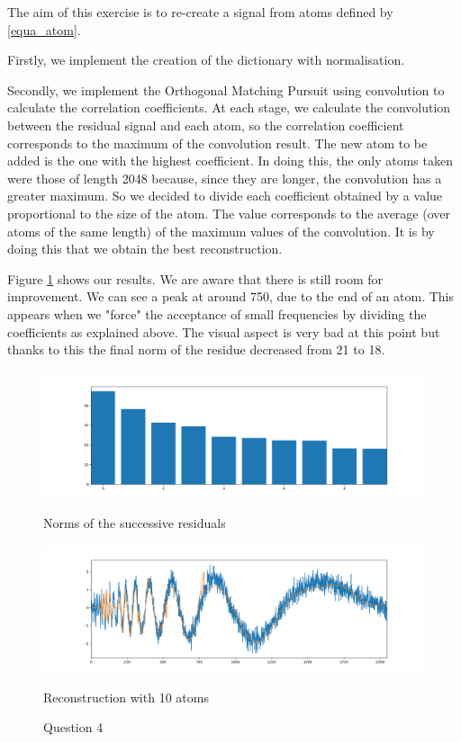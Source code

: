 \documentclass[11pt]{article}
\begin{document}
\begin{solution}

The aim of this exercise is to re-create a signal from atoms defined by \ref{equa_atom}.

Firstly, we implement the creation of the dictionary with normalisation.

Secondly, we implement the Orthogonal Matching Pursuit using convolution to calculate the correlation coefficients. At each stage, we calculate the convolution between the residual signal and each atom, so the correlation coefficient corresponds to the maximum of the convolution result. The new atom to be added is the one with the highest coefficient. In doing this, the only atoms taken were those of length 2048 because, since they are longer, the convolution has a greater maximum. So we decided to divide each coefficient obtained by a value proportional to the size of the atom. The value corresponds to the average (over atoms of the same length) of the maximum values of the convolution. It is by doing this that we obtain the best reconstruction.

Figure \ref{q4} shows our results. We are aware that there is still room for improvement. We can see a peak at around 750, due to the end of an atom. This appears when we "force" the acceptance of small frequencies by dividing the coefficients as explained above. The visual aspect is very bad at this point but thanks to this the final norm of the residue decreased from 21 to 18.





\begin{figure}
    \centering
    \begin{minipage}[t]{1\textwidth}
    \centerline{\includegraphics[width=\textwidth]{images/residu.png}}
    \centerline{Norms of the successive residuals}
    \end{minipage}
    \hfill
    \begin{minipage}[t]{1\textwidth}    \centerline{\includegraphics[width=\textwidth]{images/signal_reconstruit.png}}
    \centerline{Reconstruction with 10 atoms}
    \end{minipage}
    \caption{Question 4}
    \label{q4}
\end{figure}





\end{solution}
\end{document}
